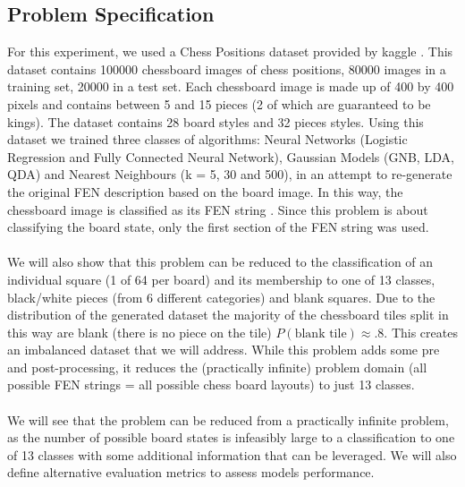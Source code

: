 \documentclass{article}
\begin{document}
\begin{multicols}{2}
\subsection{Problem Specification}
For this experiment, we used a Chess Positions dataset provided by kaggle \cite{kaggle}. This dataset contains 100000 chessboard images of chess positions, 80000 images in a training set, 20000 in a test set. Each chessboard image is made up of 400 by 400 pixels and contains between 5 and 15 pieces (2 of which are guaranteed to be kings). The dataset contains 28 board styles and 32 pieces styles. Using this dataset we trained three classes of algorithms: Neural Networks (Logistic Regression and Fully Connected Neural Network), Gaussian Models (GNB, LDA, QDA) and Nearest Neighbours (k = 5, 30 and 500), in an attempt to re-generate the original FEN description based on the board image. In this way, the chessboard image is classified as its FEN string \cite{FEN}. Since this problem is about classifying the board state, only the first section of the FEN string was used.
\\
\\
We will also show that this problem can be reduced to the classification of an individual square (1 of 64 per board) and its membership to one of 13 classes, black/white pieces (from 6 different categories) and blank squares. Due to the distribution of the generated dataset \cite{kaggle} the majority of the chessboard tiles split in this way are blank (there is no piece on the tile) $P\left(\mbox{blank tile}\right) \approx .8$. This creates an imbalanced dataset that we will address. While this problem adds some pre and post-processing, it reduces the (practically infinite) problem domain (all possible FEN strings = all possible chess board layouts) to just 13 classes.
\\\\
We will see that the problem can be reduced from a practically infinite problem, as the number of possible board states is infeasibly large to a classification to one of 13 classes with some additional information that can be leveraged. We will also define alternative evaluation metrics to assess models performance.



\end{multicols}
\end{document}
